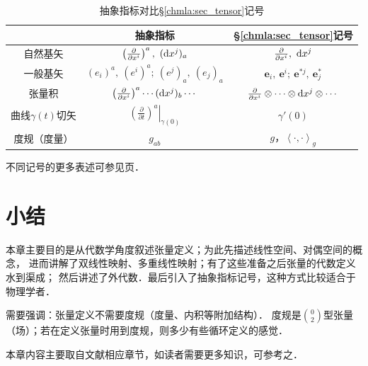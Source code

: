 \begin{table}[htb]
    \centering
    \caption{抽象指标对比\S\ref{chmla:sec_tensor}记号} \label{chmla:tab-aivscc}
    \begin{tabular}{|*3{c|}}
        \hline
        {} & 抽象指标 & \S\ref{chmla:sec_tensor}记号 \\ 
        \hline
        自然基矢 & $\left(\frac{\partial}{\partial x^i} \right)^a,\  ({\rm d}x^j)_a$ 
                 & $\frac{\partial}{\partial x^i}, \  {\rm d}x^j$    \\ 
        \hline
        一般基矢 & $(e_i)^a,\ (e^i)^a;\ (e^j)_a,\ (e_j)_a$ &  $\boldsymbol{e}_i,\ \boldsymbol{e}^i;\ 
        \boldsymbol{e}^{*j},\  \boldsymbol{e}^{*}_{j} $    \\ 
        \hline
        张量积   & $\left(\frac{\partial}{\partial x^i} \right)^a \cdots ({\rm d}x^j)_b \cdots $ 
                   &  $\frac{\partial}{\partial x^i}\otimes \cdots\otimes
                   {\rm d}x^j \otimes \cdots$    \\ 
        \hline        
        曲线$\gamma(t)$切矢 & $\left.\left(\frac{\partial}{\partial t} \right)^a \right|_{\gamma(0)} $ 
          & $\gamma'(0)$  \\ 
        \hline
        度规（度量） & $g_{ab}$ & $g$，$\left<\cdot ,\cdot \right>_{g}$ \\ \hline
    \end{tabular}
\end{table}

\begin{remark}
	不同记号的更多表述可参见\pageref{chrg:sec_music-iso}页．
\end{remark}



\section*{小结}


本章主要目的是从代数学角度叙述张量定义；为此先描述线性空间、对偶空间的概念，
进而讲解了双线性映射、多重线性映射；有了这些准备之后张量的代数定义水到渠成；
然后讲述了外代数．最后引入了抽象指标记号，这种方式比较适合于物理学者．


需要强调：张量定义不需要度规（度量、内积等附加结构）．
度规是$\binom{0}{2}$型张量（场）；若在定义张量时用到度规，则多少有些循环定义的感觉．

本章内容主要取自文献\parencite{qiuws-2019-v2}相应章节，如读者需要更多知识，可参考之．

\endinput



